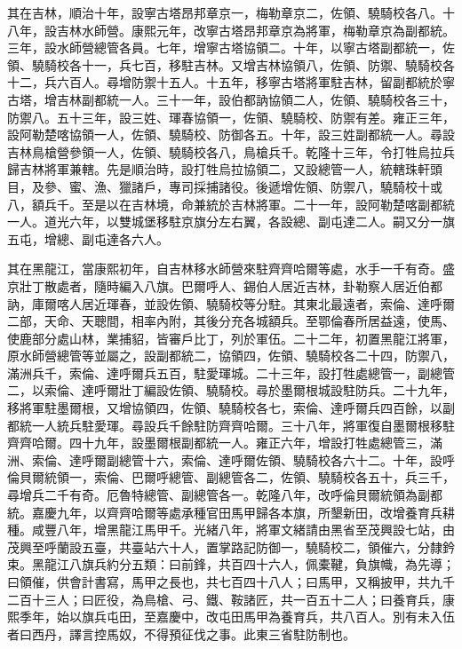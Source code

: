 \begin{pinyinscope}
其在吉林，順治十年，設寧古塔昂邦章京一，梅勒章京二，佐領、驍騎校各八。十八年，設吉林水師營。康熙元年，改寧古塔昂邦章京為將軍，梅勒章京為副都統。三年，設水師營總管各員。七年，增寧古塔協領二。十年，以寧古塔副都統一，佐領、驍騎校各十一，兵七百，移駐吉林。又增吉林協領八，佐領、防禦、驍騎校各十二，兵六百人。尋增防禦十五人。十五年，移寧古塔將軍駐吉林，留副都統於寧古塔，增吉林副都統一人。三十一年，設伯都訥協領二人，佐領、驍騎校各三十，防禦八。五十三年，設三姓、琿春協領一，佐領、驍騎校、防禦有差。雍正三年，設阿勒楚喀協領一人，佐領、驍騎校、防御各五。十年，設三姓副都統一人。尋設吉林鳥槍營參領一人，佐領、驍騎校各八，鳥槍兵千。乾隆十三年，令打牲烏拉兵歸吉林將軍兼轄。先是順治時，設打牲烏拉協領二，又設總管一人，統轄珠軒頭目，及參、蜜、漁、獵諸戶，專司採捕諸役。後遞增佐領、防禦八，驍騎校十或八，額兵千。至是以在吉林境，命兼統於吉林將軍。二十一年，設阿勒楚喀副都統一人。道光六年，以雙城堡移駐京旗分左右翼，各設總、副屯達二人。嗣又分一旗五屯，增總、副屯達各六人。

其在黑龍江，當康熙初年，自吉林移水師營來駐齊齊哈爾等處，水手一千有奇。盛京壯丁散處者，隨時編入八旗。巴爾呼人、錫伯人居近吉林，卦勒察人居近伯都訥，庫爾喀人居近琿春，並設佐領、驍騎校等分駐。其東北最遠者，索倫、達呼爾二部，天命、天聰間，相率內附，其後分充各城額兵。至鄂倫春所居益遠，使馬、使鹿部分處山林，業捕貂，皆審戶比丁，列於軍伍。二十二年，初置黑龍江將軍，原水師營總管等並屬之，設副都統二，協領四，佐領、驍騎校各二十四，防禦八，滿洲兵千，索倫、達呼爾兵五百，駐愛琿城。二十三年，設打牲處總管一，副總管二，以索倫、達呼爾壯丁編設佐領、驍騎校。尋於墨爾根城設駐防兵。二十九年，移將軍駐墨爾根，又增協領四，佐領、驍騎校各七，索倫、達呼爾兵四百餘，以副都統一人統兵駐愛琿。尋設兵千餘駐防齊齊哈爾。三十八年，將軍復自墨爾根移駐齊齊哈爾。四十九年，設墨爾根副都統一人。雍正六年，增設打牲處總管三，滿洲、索倫、達呼爾副總管十六，索倫、達呼爾佐領、驍騎校各六十二。十年，設呼倫貝爾統領一，索倫、巴爾呼總管、副總管各二，佐領、驍騎校各五十，兵三千，尋增兵二千有奇。厄魯特總管、副總管各一。乾隆八年，改呼倫貝爾統領為副都統。嘉慶九年，以齊齊哈爾等處承種官田馬甲歸各本旗，所墾新田，改增養育兵耕種。咸豐八年，增黑龍江馬甲千。光緒八年，將軍文緒請由黑省至茂興設七站，由茂興至呼蘭設五臺，共臺站六十人，置掌路記防御一，驍騎校二，領催六，分隸鈐束。黑龍江八旗兵約分五類：曰前鋒，共百四十六人，佩橐鞬，負旗幟，為先導；曰領催，供會計書寫，馬甲之長也，共七百四十八人；曰馬甲，又稱披甲，共九千二百十三人；曰匠役，為鳥槍、弓、鐵、鞍諸匠，共一百五十二人；曰養育兵，康熙季年，始以旗兵屯田，至嘉慶中，改屯田馬甲為養育兵，共八百人。別有未入伍者曰西丹，譯言控馬奴，不得預征伐之事。此東三省駐防制也。


\end{pinyinscope}
